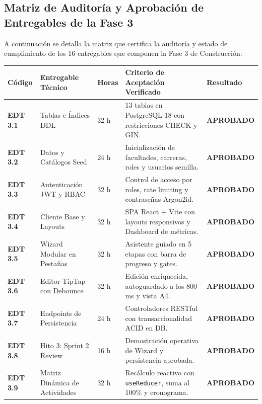 \documentclass[12pt,a4paper]{article}
\begin{document}
\subsection{Matriz de Auditoría y Aprobación de Entregables de la Fase 3}
A continuación se detalla la matriz que certifica la auditoría y estado de cumplimiento de los 16 entregables que componen la Fase 3 de Construcción:
\begin{table}[H]
\centering
\small
\renewcommand{\arraystretch}{1.15}
\begin{tabularx}{\textwidth}{|>{\hsize=0.55\hsize\centering\arraybackslash\bfseries\footnotesize}X|>{\hsize=1.15\hsize\raggedright\arraybackslash\footnotesize}X|>{\hsize=0.50\hsize\centering\arraybackslash\footnotesize}X|>{\hsize=2.10\hsize\raggedright\arraybackslash\footnotesize}X|>{\hsize=0.70\hsize\centering\arraybackslash\footnotesize}X|}
\hline
\rowcolor{tableheader}
\textbf{Código} & \textbf{Entregable Técnico} & \textbf{Horas} & \textbf{Criterio de Aceptación Verificado} & \textbf{Resultado} \\
\hline
\textbf{EDT 3.1} & Tablas e Índices DDL & 32 h & 13 tablas en PostgreSQL 18 con restricciones CHECK y GIN. & \textbf{APROBADO} \\
\hline
\textbf{EDT 3.2} & Datos y Catálogos Seed & 24 h & Inicialización de facultades, carreras, roles y usuarios semilla. & \textbf{APROBADO} \\
\hline
\textbf{EDT 3.3} & Autenticación JWT y RBAC & 32 h & Control de acceso por roles, rate limiting y contraseñas Argon2id. & \textbf{APROBADO} \\
\hline
\textbf{EDT 3.4} & Cliente Base y Layouts & 32 h & SPA React + Vite con layouts responsivos y Dashboard de métricas. & \textbf{APROBADO} \\
\hline
\textbf{EDT 3.5} & Wizard Modular en Pestañas & 32 h & Asistente guiado en 5 etapas con barra de progreso y gates. & \textbf{APROBADO} \\
\hline
\textbf{EDT 3.6} & Editor TipTap con Debounce & 32 h & Edición enriquecida, autoguardado a los 800 ms y vista A4. & \textbf{APROBADO} \\
\hline
\textbf{EDT 3.7} & Endpoints de Persistencia & 24 h & Controladores RESTful con transaccionalidad ACID en DB. & \textbf{APROBADO} \\
\hline
\textbf{EDT 3.8} & Hito 3: Sprint 2 Review & 16 h & Demostración operativa de Wizard y persistencia aprobada. & \textbf{APROBADO} \\
\hline
\textbf{EDT 3.9} & Matriz Dinámica de Actividades & 32 h & Recálculo reactivo con \texttt{useReducer}, suma al 100\% y cronograma. & \textbf{APROBADO} \\

\end{tabularx}
\end{table}
\end{document}
